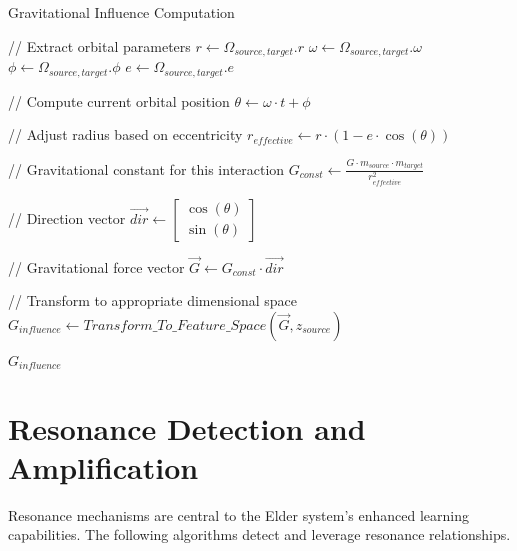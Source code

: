 \begin{algorithm}
\caption{Gravitational Influence Computation}
\begin{algorithmic}[1]
    \State // Extract orbital parameters
    \State $r \gets \Omega_{source,target}.r$ 
    \State $\omega \gets \Omega_{source,target}.\omega$ 
    \State $\phi \gets \Omega_{source,target}.\phi$ 
    \State $e \gets \Omega_{source,target}.e$ 
    
    \State // Compute current orbital position
    \State $\theta \gets \omega \cdot t + \phi$ 
    
    \State // Adjust radius based on eccentricity
    \State $r_{effective} \gets r \cdot (1 - e \cdot \cos(\theta))$
    
    \State // Gravitational constant for this interaction
    \State $G_{const} \gets \frac{G \cdot m_{source} \cdot m_{target}}{r_{effective}^2}$
    
    \State // Direction vector
    \State $\vec{dir} \gets \begin{bmatrix} \cos(\theta) \\ \sin(\theta) \end{bmatrix}$
    
    \State // Gravitational force vector
    \State $\vec{G} \gets G_{const} \cdot \vec{dir}$
    
    \State // Transform to appropriate dimensional space
    \State $G_{influence} \gets Transform\_To\_Feature\_Space(\vec{G}, z_{source})$
    
    \State \Return $G_{influence}$
\EndFunction
\end{algorithmic}
\end{algorithm}

\section{Resonance Detection and Amplification}



Resonance mechanisms are central to the Elder system's enhanced learning capabilities. The following algorithms detect and leverage resonance relationships.

